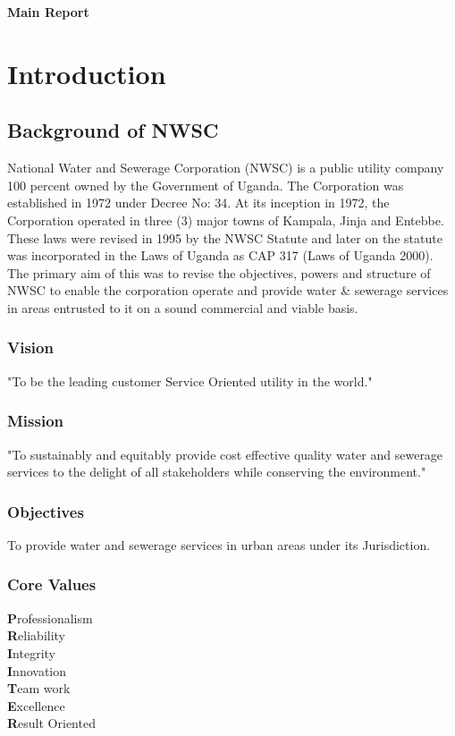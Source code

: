 \documentclass{article}
\begin{document}
\newpage
\textbf{Main Report}\\
\section{Introduction}\cite{r1}
\subsection{Background of NWSC}
National Water and Sewerage Corporation (NWSC) is a public utility company 100 percent owned by the Government of Uganda. The Corporation was established in 1972 under Decree No: 34. At its inception in 1972, the Corporation operated in three (3) major towns of Kampala, Jinja and Entebbe. These laws were revised in 1995 by the NWSC Statute and later on the statute was incorporated in the Laws of Uganda as CAP 317 (Laws of Uganda 2000). The primary aim of this was to revise the objectives, powers and structure of NWSC to enable the corporation operate and provide water \& sewerage services in areas entrusted to it on a sound commercial and viable basis.
\subsubsection{Vision}
"To be the leading customer Service Oriented utility in the world." 
\subsubsection{Mission}
"To sustainably and equitably provide cost effective quality water and sewerage services to the delight of all stakeholders while conserving the environment."
\subsubsection{Objectives}
To provide water and sewerage services in urban areas under its Jurisdiction.
\subsubsection{Core Values}
\textbf{P}rofessionalism\\ 
\textbf{R}eliability\\
\textbf{I}ntegrity\\
\textbf{I}nnovation\\
\textbf{T}eam work\\
\textbf{E}xcellence\\
\textbf{R}esult Oriented\\
\end{document}
